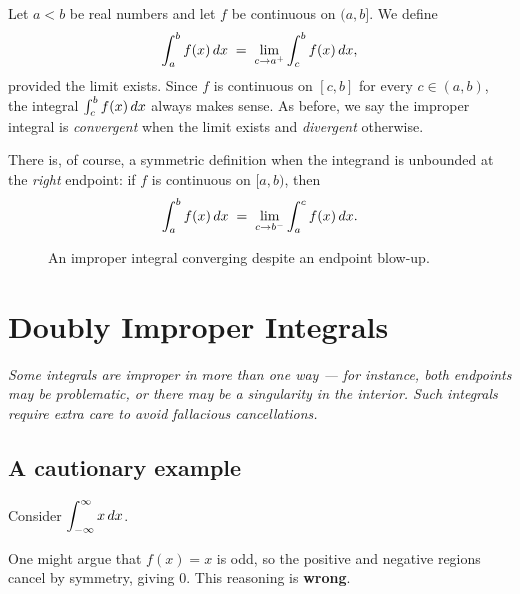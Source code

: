 \begin{definition}
\label{def:12-2}
Let $a<b$ be real numbers and let $f$ be continuous on $(a,b]$.  We define
\[
  \int_{a}^{b}f(x)\,dx \;=\; \lim_{c\to a^{+}}\int_{c}^{b}f(x)\,dx,
\]
provided the limit exists.  Since $f$ is continuous on $[c,b]$ for every $c\in(a,b)$, the integral $\int_{c}^{b}f(x)\,dx$ always makes sense.  As before, we say the improper integral is \emph{convergent} when the limit exists and \emph{divergent} otherwise.
\end{definition}

\begin{remark}
There is, of course, a symmetric definition when the integrand is unbounded at the \emph{right} endpoint: if $f$ is continuous on $[a,b)$, then
\[
  \int_{a}^{b}f(x)\,dx \;=\; \lim_{c\to b^{-}}\int_{a}^{c}f(x)\,dx.
\]
\end{remark}

\begin{figure}[ht]
  \centering
  
  \caption{An improper integral converging despite an endpoint blow-up.}
  \label{fig:unbounded-integrand-integrable}
\end{figure}

\section{Doubly Improper Integrals}
\label{sec:12.6}

\textit{Some integrals are improper in more than one way --- for instance, both endpoints may be problematic, or there may be a singularity in the interior.  Such integrals require extra care to avoid fallacious cancellations.}

\subsection*{A cautionary example}

\begin{example}
\label{ex:12-5}
Consider $\displaystyle\int_{-\infty}^{\infty}x\,dx$.

One might argue that $f(x)=x$ is odd, so the positive and negative regions cancel by symmetry, giving $0$.  This reasoning is \textbf{wrong}.
\end{example}

